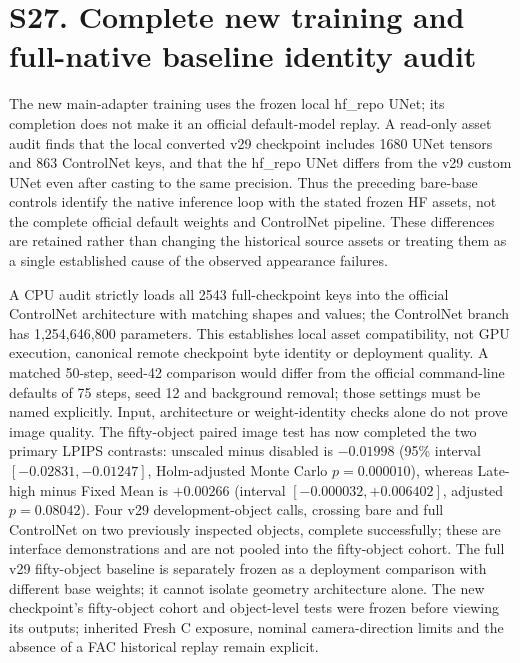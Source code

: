 \documentclass[11pt]{article}
\begin{document}
\section*{S27. Complete new training and full-native baseline identity audit}
The new main-adapter training uses the frozen local hf\_repo UNet; its completion does not make it an official default-model replay. A read-only asset audit finds that the local converted v29 checkpoint includes 1680 UNet tensors and 863 ControlNet keys, and that the hf\_repo UNet differs from the v29 custom UNet even after casting to the same precision. Thus the preceding bare-base controls identify the native inference loop with the stated frozen HF assets, not the complete official default weights and ControlNet pipeline. These differences are retained rather than changing the historical source assets or treating them as a single established cause of the observed appearance failures.

A CPU audit strictly loads all 2543 full-checkpoint keys into the official ControlNet architecture with matching shapes and values; the ControlNet branch has 1,254,646,800 parameters. This establishes local asset compatibility, not GPU execution, canonical remote checkpoint byte identity or deployment quality. A matched 50-step, seed-42 comparison would differ from the official command-line defaults of 75 steps, seed 12 and background removal; those settings must be named explicitly. Input, architecture or weight-identity checks alone do not prove image quality. The fifty-object paired image test has now completed the two primary LPIPS contrasts: unscaled minus disabled is $-0.01998$ (95\% interval $[-0.02831,-0.01247]$, Holm-adjusted Monte Carlo $p=0.000010$), whereas Late-high minus Fixed Mean is $+0.00266$ (interval $[-0.000032,+0.006402]$, adjusted $p=0.08042$). Four v29 development-object calls, crossing bare and full ControlNet on two previously inspected objects, complete successfully; these are interface demonstrations and are not pooled into the fifty-object cohort. The full v29 fifty-object baseline is separately frozen as a deployment comparison with different base weights; it cannot isolate geometry architecture alone. The new checkpoint's fifty-object cohort and object-level tests were frozen before viewing its outputs; inherited Fresh C exposure, nominal camera-direction limits and the absence of a FAC historical replay remain explicit.
\end{document}
